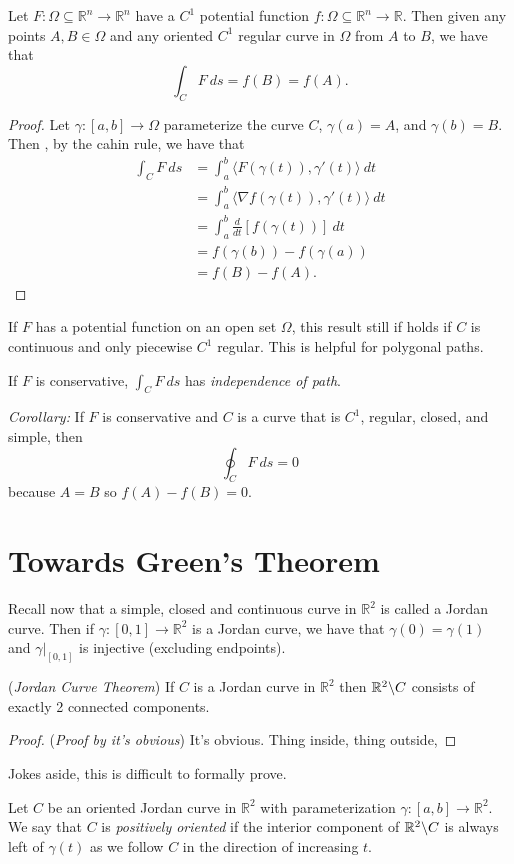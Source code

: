 \documentclass[11pt]{article}
\theoremstyle{definition}
\newcommand{\R}{\mathbb{R}}                      %
\newcommand{\bslash}{\symbol{92}}
\begin{document}
\prop Let $F:\Omega\subseteq \R^n \to \R^n$ have a $C^1$ potential function $f:\Omega\subseteq\R^n \to \R$. Then given any points $A,B\in \Omega$ and any oriented $C^1$ regular curve in $\Omega$ from $A$ to $B$, we have that
$$
\int_C F~ds = f(B)=f(A).
$$

\begin{proof}
    Let $\gamma:[a,b]\to \Omega$ parameterize the curve $C$, $\gamma(a)=A$, and $\gamma(b)=B$. Then , by the cahin rule, we have that
    $$
    \begin{aligned}
        \int_C F~ds &= \int_a^b \langle F(\gamma(t)),\gamma'(t)\rangle ~dt\\
        &= \int_a^b \langle \nabla f(\gamma(t)),\gamma'(t)\rangle ~dt\\
        &= \int_a^b \frac{d}{dt}[f(\gamma(t))]~dt\\
        &= f(\gamma(b))-f(\gamma(a))\\
        &= f(B)-f(A).
    \end{aligned}
    $$
\end{proof}
\note If $F$ has a potential function on an open set $\Omega$, this result still if holds if $C$ is continuous and only piecewise $C^1$ regular. This is helpful for polygonal paths.

\note If $F$ is conservative, $\int_C F~ds$ has \textit{independence of path}.

\textit{Corollary:} If $F$ is conservative and $C$ is a curve that is $C^1$, regular, closed, and simple, then
$$
\oint_C F~ds=0
$$
because $A=B$ so $f(A)-f(B)=0$.

\section{Towards Green's Theorem}

Recall now that a simple, closed and continuous curve in $\R^2$ is called a Jordan curve. Then if $\gamma:[0,1]\to\R^2$ is a Jordan curve, we have that $\gamma(0)=\gamma(1)$ and $\gamma|_{[0,1]}$ is injective (excluding endpoints).

\begin{shaded}
\theorem (\textit{Jordan Curve Theorem}) If $C$ is a Jordan curve in $\R^2$ then $\R^2\bslash C$ consists of exactly 2 connected components.
\end{shaded}
\begin{proof}
    (\textit{Proof by it's obvious}) It's obvious. Thing inside, thing outside,
\end{proof}

Jokes aside, this is difficult to formally prove.

\begin{mdframed}[backgroundcolor = blue!10]
\vspace{+0.1cm}
 Let $C$ be an oriented Jordan curve in $\R^2$ with parameterization $\gamma:[a,b] \to \R^2$. We say that $C$ is \textit{positively oriented} if the interior component of $\R^2\bslash C$  is always left of $\gamma(t)$ as we follow $C$ in the direction of increasing $t$.

\end{mdframed}
\end{document}
